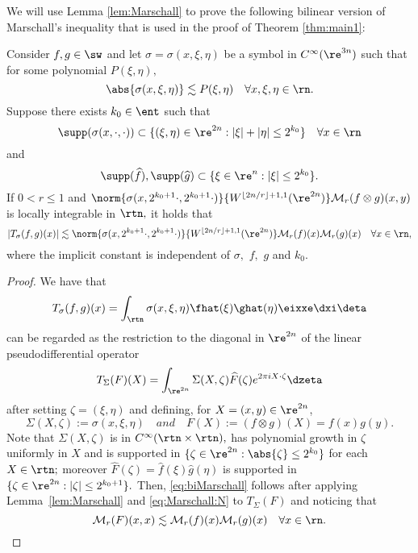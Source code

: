 We will use Lemma \ref{lem:Marschall} to prove the following bilinear version of Marschall's inequality that is used in the proof of Theorem \ref{thm:main1}:
\begin{lemma}\label{lem:biMarschall}  Consider $f,g\in\sw$  and let $\sigma=\sigma(x,\xi,\eta)$ be a  symbol in $C^\infty(\re^{3n})$ 
such that for some polynomial $P(\xi,\eta),$
\[
\abs{\sigma(x,\xi,\eta)}\lesssim P(\xi,\eta)\quad \forall x,\xi,\eta\in\rn.
\]
Suppose there exists $k_0\in\ent$  such that
$$
\supp(\sigma(x, \cdot, \cdot)) \subset \{(\xi, \eta) \in \re^{2n}: |\xi| + |\eta| \le 2^{k_0}\}\quad \forall x\in\rn
$$
and 
$$
\supp(\widehat{f}), \supp(\widehat{g}) \subset \{\xi \in \re^{n}: |\xi| \le 2^{k_0}\}.
$$
If $0< r\le1$ and $\norm{\sigma(x, 2^{k_0+1} \cdot, 2^{k_0+1} \cdot)}{W^{\lfloor{2n/r}\rfloor + 1,1}(\re^{2n})} \mathcal{M}_r(f\otimes g)(x,y) $ is locally integrable in $\rtn,$ it holds that
\begin{equation}\label{eq:biMarschall}
|T_{\sigma}(f,g)(x)| \lesssim  \norm{\sigma(x, 2^{k_0+1} \cdot, 2^{k_0+1} \cdot)}{W^{\lfloor{2n/r}\rfloor + 1,1}(\re^{2n})} \mathcal{M}_r(f)(x) \mathcal{M}_r(g)(x) \quad \forall x \in \rn,
\end{equation}
where the implicit constant is independent of $\sigma,$  $f,$ $g$ and $k_0.$
\end{lemma}
\begin{proof}
 We have that
$$
T_{\sigma}(f,g)(x) = \int_{\rtn} \sigma(x, \xi, \eta) \fhat(\xi) \ghat(\eta) \eixxe\dxi\deta
$$
can be regarded as the restriction to the diagonal in $\re^{2n}$ of the linear pseudodifferential operator
$$
T_\Sigma(F)(X) = \int_{\re^{2n}} \Sigma(X, \zeta) \widehat{F}(\zeta) e^{2\pi i X \cdot \zeta } \dzeta
$$
after setting $\zeta=(\xi, \eta)$ and defining, for $X = (x, y) \in \re^{2n}$, 
$$
\Sigma(X, \zeta) :=\sigma(x, \xi, \eta)\quad and \quad F(X):= (f\otimes g) (X)=f(x)g(y).
$$
Note that $\Sigma(X, \zeta)$ is in $C^\infty(\rtn\times \rtn),$  has polynomial growth in $\zeta$ uniformly in $X$ and  is supported in $\{\zeta\in\re^{2n}: \abs{\zeta}\le 2^{k_0}\}$ for each $X\in \rtn;$ moreover $\widehat{F}(\zeta) =  \widehat{f}(\xi) \widehat{g}(\eta)$ is supported in $\{\zeta \in \re^{2n}: |\zeta| \leq 2^{k_0+1} \}.$ Then, \eqref{eq:biMarschall} follows after applying Lemma~\ref{lem:Marschall}  and \eqref{eq:Marschall:N} to $T_{\Sigma}(F)$ and noticing that 
\[
\mathcal{M}_r(F)(x, x)\lesssim \mathcal{M}_r(f)(x)\mathcal{M}_r(g)(x)\quad \forall x\in\rn.
\]
\end{proof}

